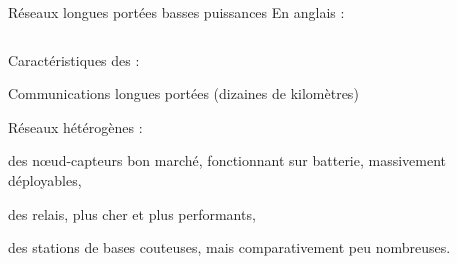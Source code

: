 \documentclass[../main.tex]{subfiles}
\begin{document}
\begin{frame}{Réseaux longues portées basses puissances}
  {En anglais : }


  \begin{columns}
    \begin{column}{.5\linewidth}
      Caractéristiques des  \cite{IEEEStandardLPWAN} :

      \begin{ctrlitemize}{5pt}
        \item Communications longues portées (dizaines de kilomètres)
        \item Réseaux hétérogènes :
        \begin{ctrlitemize}{2pt}
          \item des nœud-capteurs bon marché, fonctionnant sur batterie, massivement déployables,
          \item des relais, plus cher et plus performants,
          \item des stations de bases couteuses, mais comparativement peu nombreuses.
        \end{ctrlitemize}
      \end{ctrlitemize}
    \end{column}
  \end{columns}
\end{frame}
\end{document}
